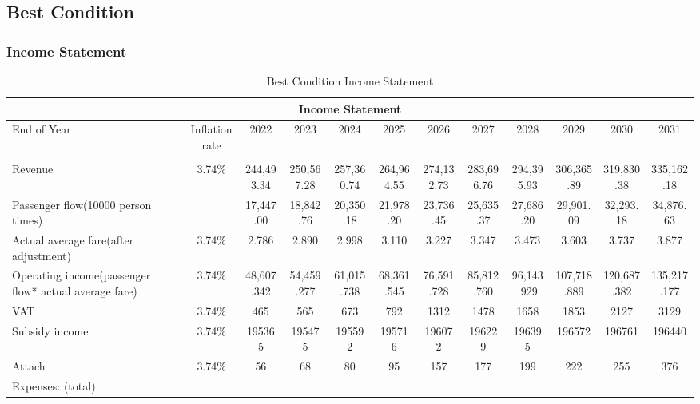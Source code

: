 \documentclass[12pt]{article}
\begin{document}
\begin{landscape}

\subsection{Best Condition}
\subsubsection{Income Statement}
\begin{table}[htbp]
\scriptsize
  \centering
  \caption{Best Condition Income Statement}
    \begin{tabular}{|p{12.59em}|c|c|c|c|c|c|c|c|c|c|c|}
    \toprule
    \multicolumn{12}{|c|}{\textbf{Income Statement}} \\
    \hline
    End of Year & \multicolumn{1}{p{6.41em}|}{Inflation rate} & 2022  & 2023  & 2024  & 2025  & 2026  & 2027  & 2028  & 2029  & 2030  & 2031 \\
    \hline
    \multicolumn{1}{|c|}{} &       &       &       &       &       &       &       &       &       &       &  \\
    \hline
    Revenue & 3.74\% & 244,493.34 & 250,567.28 & 257,360.74 & 264,964.55 & 274,132.73 & 283,696.76 & 294,395.93 & 306,365.89 & 319,830.38 & 335,162.18 \\
    \hline
    Passenger flow(10000 person times) &       & 17,447.00 & 18,842.76 & 20,350.18 & 21,978.20 & 23,736.45 & 25,635.37 & 27,686.20 & 29,901.09 & 32,293.18 & 34,876.63 \\
    \hline
     Actual average fare(after adjustment) & 3.74\% & 2.786 & 2.890 & 2.998 & 3.110 & 3.227 & 3.347 & 3.473 & 3.603 & 3.737 & 3.877 \\
    \hline
    Operating income(passenger flow* actual average fare) & 3.74\% & 48,607.342 & 54,459.277 & 61,015.738 & 68,361.545 & 76,591.728 & 85,812.760 & 96,143.929 & 107,718.889 & 120,687.382 & 135,217.177 \\
    \hline
    VAT   & 3.74\% & 465   & 565   & 673   & 792   & 1312  & 1478  & 1658  & 1853  & 2127  & 3129 \\
    \hline
    Subsidy income & 3.74\% & 195365 & 195475 & 195592 & 195716 & 196072 & 196229 & 196395 & 196572 & 196761 & 196440 \\
    \hline
    Attach & 3.74\% & 56    & 68    & 80    & 95    & 157   & 177   & 199   & 222   & 255   & 376 \\
    \hline
    Expenses: (total) &       &       &       &       &       &       &       &       &       &       &  \\

\end{tabular}
\end{table}
\end{landscape}
\end{document}
